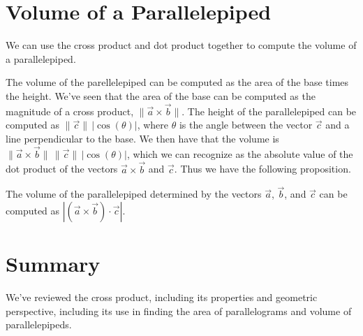 \documentclass{ximera}
\begin{document}
\section*{Volume of a Parallelepiped}

We can use the cross product and dot product together to compute the volume of a parallelepiped.

\begin{image}
\end{image}

The volume of the parellelepiped can be computed as the area of the base times the height. We've seen that the area of the base can be computed as the magnitude of a cross product, $\|\vec{a}\times\vec{b}\|$. The height of the parallelepiped can be computed as $\|\vec{c}\|\,|\cos(\theta)|$, where $\theta$ is the angle between the vector $\vec{c}$ and a line perpendicular to the base. We then have that the volume is $\|\vec{a}\times\vec{b}\|\,\|\vec{c}\|\,|\cos(\theta)|$, which we can recognize as the absolute value of the dot product of the vectors $\vec{a}\times\vec{b}$ and $\vec{c}$. Thus we have the following proposition.

\begin{proposition}
The volume of the parallelepiped determined by the vectors $\vec{a}$, $\vec{b}$, and $\vec{c}$ can be computed as $|(\vec{a}\times\vec{b})\cdot\vec{c}|$.
\end{proposition}

\section*{Summary}

We've reviewed the cross product, including its properties and geometric perspective, including its use in finding the area of parallelograms and volume of parallelepipeds.
\end{document}
